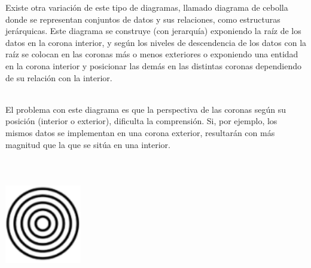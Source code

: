 \documentclass{article}\usepackage[]{graphicx}\usepackage[]{color}
\begin{document}
Existe otra variaci\'on de este tipo de diagramas, llamado diagrama de cebolla\cite{cebolla} donde se representan conjuntos de datos y sus relaciones, como estructuras jer\'arquicas. Este diagrama se construye (con jerarqu\'ia) exponiendo la ra\'iz de los datos en la corona interior, y seg\'un los niveles de descendencia de los datos con la ra\'iz se colocan en las coronas m\'as o menos exteriores o exponiendo una entidad en la corona interior y posicionar las dem\'as en las distintas coronas dependiendo de su relaci\'on con la interior\cite{cebolla_biogas}\cite{cebolla_cultura}.~\\~\par
El problema con este diagrama es que la perspectiva de las coronas seg\'un su posici\'on (interior o exterior), dificulta la comprensi\'on. Si, por ejemplo, los mismos datos se implementan en una corona exterior, resultar\'an con m\'as magnitud que la que se sit\'ua en una interior.
~\\~\\~\\~\\
\vbox{
    \centering
    \includegraphics[width=0.25\textwidth]{imag/anillos}
}
\clearpage
\end{document}

